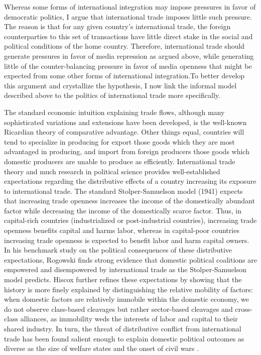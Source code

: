 \documentclass[12pt,a4paper]{article}
\begin{document}
Whereas some forms of international integration may impose pressures in favor of democratic politics, I argue that international trade imposes little such pressure. The reason is that for any given country's international trade, the foreign counterparties to this set of transactions have little direct stake in the social and political conditions of the home country. Therefore, international trade should generate pressures in favor of media repression as argued above, while generating little of the counter-balancing pressure in favor of media openness that might be expected from some other forms of international integration.To better develop this argument and crystallize the hypothesis, I now link the informal model described above to the politics of international trade more specifically.

The standard economic intuition explaining trade flows, although many sophisticated variations and extensions have been developed, is the well-known Ricardian theory of comparative advantage. Other things equal, countries will tend to specialize in producing for export those goods which they are most advantaged in producing, and import from foreign producers those goods which domestic producers are unable to produce as efficiently. International trade theory and much research in political science provides well-established expectations regarding the distributive effects of a country increasing its exposure to international trade. The standard Stolper-Samuelson model (1941) expects that increasing trade openness increases the income of the domestically abundant factor while decreasing the income of the domestically scarce factor. Thus, in capital-rich countries (industrialized or post-industrial countries), increasing trade openness benefits capital and harms labor, whereas in capital-poor countries increasing trade openness is expected to benefit labor and harm capital owners. In his benchmark study on the political consequences of these distributive expectations, Rogowski \parencite*{Rogowski:1989wm} finds strong evidence that domestic political coalitions are empowered and disempowered by international trade as the Stolper-Samuelson model predicts. Hiscox \parencite*{Hiscox:2002us} further refines these expectations by showing that the history is more finely explained by distinguishing the relative mobility of factors: when domestic factors are relatively immobile within the domestic economy, we do not observe class-based cleavages but rather sector-based cleavages and cross-class alliances, as immobility weds the interests of labor and capital to their shared industry. In turn, the threat of distributive conflict from international trade has been found salient enough to explain domestic political outcomes as diverse as the size of welfare states \parencites{Cameron:1978vb}{Burgoon:2001dp} and the onset of civil wars \parencite{Bussmann:2007vx}.
\end{document}
